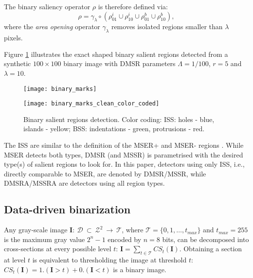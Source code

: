 \documentclass[conference,compsoc]{IEEEtran}
\newcommand {\be}{\begin{equation}}
\newcommand {\ee}{\end{equation}}
\def\I{{\mathbf I}}
\def\mcT{{\mathcal{T}}}
\def\mcD{{\mathcal{D}}}
\def\S{{\mathbf S}}
\begin{document}
The binary saliency operator $\rho$ is therefore defined via:
\be
\rho = \gamma_\lambda \circ (\rho^i_{01} \cup\rho^i_{10} \cup
\rho^b_{01} \cup \rho^b_{10}),
\ee
where the  {\em area opening} operator  $\gamma_{\lambda}$ removes isolated regions smaller than $\lambda$ pixels.
\begin{comment}
The hole-filling operation does not depend on the size of the SE, therefore the ISS can be detected as affine covariant regions.
This is not the case for the scale-invariance of the detected BSS. 
We propose choosing a small $r$ which also minimizes the inaccuracy of maximum $2 \pi r$ along the ``disconnection boundary''
$\partial ({\cal B}^f \backslash S_{fb}^b)$. All detected salient regions $\S$ have accurate boundaries as there is no smoothing involved.
\end{comment}

 Figure \ref{fig:binary_sal} illustrates the exact shaped binary salient 
regions detected from a synthetic $100 \times 100$ binary image with DMSR parameters $\Lambda=1/100$, $r=5$ and $\lambda = 10$. 

\begin{figure}[htb]
\vspace{-0.2cm}
\begin{minipage}[b]{.49\linewidth}
  \centering
  \centerline{\texttt{[image: binary\_marks]}}

\end{minipage}
\begin{minipage}[b]{0.49\linewidth}
  \centering
  \centerline{\texttt{[image: binary\_marks\_clean\_color\_coded]}}

\end{minipage}
\vspace{-0.3cm}
\caption{Binary salient regions detection.
Color coding: ISS: holes - blue, islands - yellow; BSS:
indentations - green, protrusions - red.}
\label{fig:binary_sal}
\end{figure}

The ISS are similar to the definition of the MSER+ and MSER- regions \cite{Matas2002BMVC}. While MSER detects both types, DMSR (and MSSR) is parametrised with the desired type(s) of salient regions to look for. In this paper, detectors using only ISS, i.e., directly comparable to MSER, are denoted by DMSR/MSSR, while DMSRA/MSSRA are detectors using all region types.

\subsection{Data-driven binarization}
\label{ssec:binarize}
Any gray-scale image  $\I:~\mcD~\subset~\mathcal{Z}^2~\rightarrow ~\mcT $, where $\mcT=\{0,1,\ldots, t_{max}\}$ and $t_{max}=255$ is the maximum gray value $2^n-1$ encoded by $n=8$ bits, can be decomposed into cross-sections at
every possible level $t$:  $\I = \sum_{t \in \mcT}CS_t(\I)$. Obtaining a section at level $t$ is equivalent to thresholding the image at threshold $t$: $CS_t(\I)= 1.(\I>t) + 0.(\I<t)$ is a binary image. 
\end{document}
